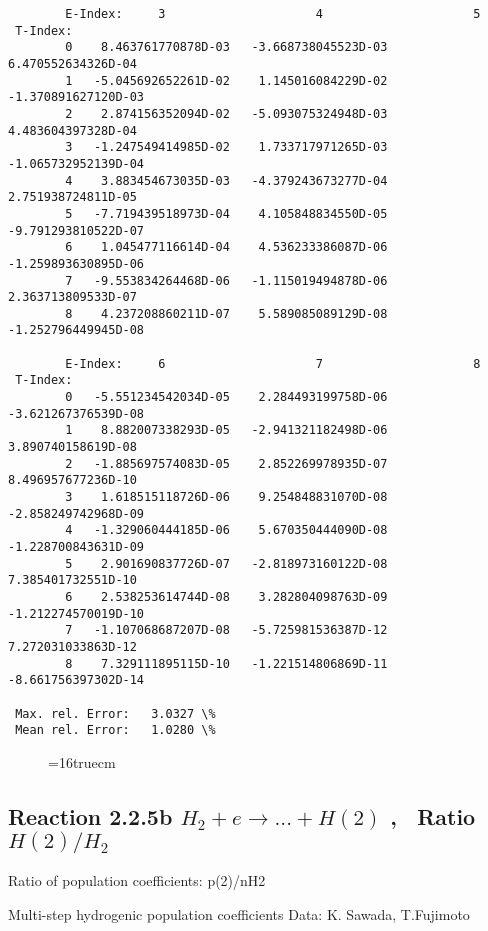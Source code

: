 \documentclass[12pt,dvipdfmx]{article}
\begin{document}
{\begin{small}
\begin{verbatim}
        E-Index:     3                     4                     5
 T-Index:
        0    8.463761770878D-03   -3.668738045523D-03    6.470552634326D-04
        1   -5.045692652261D-02    1.145016084229D-02   -1.370891627120D-03
        2    2.874156352094D-02   -5.093075324948D-03    4.483604397328D-04
        3   -1.247549414985D-02    1.733717971265D-03   -1.065732952139D-04
        4    3.883454673035D-03   -4.379243673277D-04    2.751938724811D-05
        5   -7.719439518973D-04    4.105848834550D-05   -9.791293810522D-07
        6    1.045477116614D-04    4.536233386087D-06   -1.259893630895D-06
        7   -9.553834264468D-06   -1.115019494878D-06    2.363713809533D-07
        8    4.237208860211D-07    5.589085089129D-08   -1.252796449945D-08

        E-Index:     6                     7                     8
 T-Index:
        0   -5.551234542034D-05    2.284493199758D-06   -3.621267376539D-08
        1    8.882007338293D-05   -2.941321182498D-06    3.890740158619D-08
        2   -1.885697574083D-05    2.852269978935D-07    8.496957677236D-10
        3    1.618515118726D-06    9.254848831070D-08   -2.858249742968D-09
        4   -1.329060444185D-06    5.670350444090D-08   -1.228700843631D-09
        5    2.901690837726D-07   -2.818973160122D-08    7.385401732551D-10
        6    2.538253614744D-08    3.282804098763D-09   -1.212274570019D-10
        7   -1.107068687207D-08   -5.725981536387D-12    7.272031033863D-12
        8    7.329111895115D-10   -1.221514806869D-11   -8.661756397302D-14

 Max. rel. Error:   3.0327 \%
 Mean rel. Error:   1.0280 \%

\end{verbatim}\end{small}
\begin{figure} \label{2.2.5a}
\epsfxsize=16truecm
\end{figure}
\newpage
\subsection{
Reaction 2.2.5b  $H_2 + e \rightarrow ...+ H(2) $  , \   Ratio $H(2)/H_2 $
}

 Ratio of population coefficients: p(2)/nH2

 Multi-step hydrogenic population coefficients
 Data: K. Sawada, T.Fujimoto \cite{kn:Sawada}


}
\end{document}
